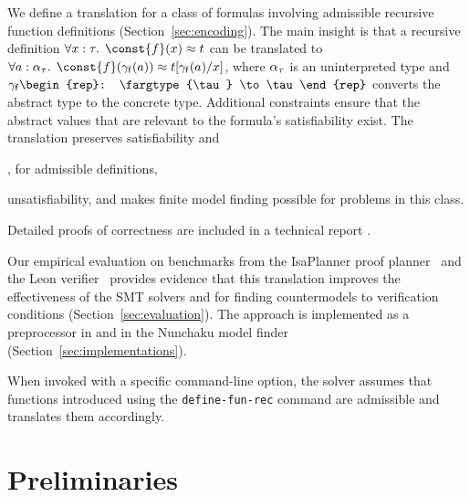 We define a translation for a class of
formulas involving admissible recursive function definitions
(Section~\ref{sec:encoding}). The main insight is that a
recursive definition $\forall x : \tau.\;\, \const{f}(x) \teq t$
can be translated to
$\forall a :
\fargtype{\tau}.\;\, \const{f}(\farg{\con{f}}(a)) \teq t[\farg{\con{f}}(a)/x]$, where
$\alpha_{\tau}$ is an uninterpreted  type and $\farg{\con{f}} \begin{rep}:
\fargtype{\tau} \to \tau\end{rep}$ converts the abstract type to the concrete
type. Additional constraints ensure that the abstract values that are relevant
to the formula's satisfiability
exist. The translation preserves satisfiability and\begin{rep}, for admissible definitions,\end{rep}
unsatisfiability, and makes finite model finding possible for problems in this
class.\begin{conf} Detailed proofs of correctness are included in a technical
report \cite{our-report}.\end{conf}

Our empirical evaluation on benchmarks from the IsaPlanner proof planner~\cite{DBLP:conf/itp/JohanssonDB10}
and the Leon verifier~\cite{blanc2013overview} provides
evidence that this translation improves the effectiveness of the SMT solvers
\cvc and \ziii for finding countermodels to verification conditions
(Section~\ref{sec:evaluation}). The approach is implemented as a preprocessor
in \cvc and in the Nunchaku model finder
(Section~\ref{sec:implementations}). \begin{rep}%
When invoked with a specific
command-line option, the solver assumes that functions introduced using the
\texttt{define-fun-rec} command are admissible and translates them accordingly.\end{rep}


%
\section{Preliminaries}
\label{sec:prelim}

